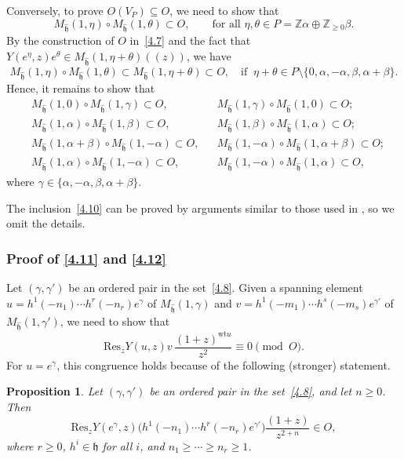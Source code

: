 \documentclass[12pt,a4paper,reqno]{amsart}
\numberwithin{equation}{section}
\numberwithin{equation}{section}
\newtheorem{prop}[thm]{Proposition}
\theoremstyle{definition}
\newcommand{\Z}{\mathbb{Z}}
\def \al{\alpha}
\def \ga {\gamma}
\def \b {\beta}
\def \op {\oplus}
\def \h {\mathfrak{h}}
\def\Res{\mathrm{Res}}
\def \wt {\mathrm{wt}}
\begin{document}
	Conversely, to prove $O(V_P)\subseteq O$, we need to show that 
	\begin{equation}\label{eq:goal}
		M_{\hat{\h}}(1,\eta)\circ M_{\hat{\h}}(1,\theta)\subset O, 
		\qquad \text{for all } \eta,\theta\in P=\Z\al\op\Z_{\geq 0}\b.
	\end{equation}
	By the construction of $O$ in~\eqref{4.7} and the fact that 
	$Y(e^{\eta},z)e^{\theta}\in M_{\hat{\h}}(1,\eta+\theta)((z))$, we have 
	\[
	M_{\hat{\h}}(1,\eta)\circ M_{\hat{\h}}(1,\theta)\subset M_{\hat{\h}}(1,\eta+\theta)\subset O,
	\quad \text{if }\ \eta+\theta\in P\setminus\{0,\al,-\al,\b,\al+\b\}.
	\]
	Hence, it remains to show that 
	\begin{align}
		&M_{\hat{\h}}(1,0)\circ M_{\hat{\h}}(1,\ga)\subset O,&&
		M_{\hat{\h}}(1,\ga)\circ M_{\hat{\h}}(1,0)\subset O; \label{4.10}\\
		&M_{\hat{\h}}(1,\al)\circ M_{\hat{\h}}(1,\b)\subset O,&&
		M_{\hat{\h}}(1,\b)\circ M_{\hat{\h}}(1,\al)\subset O; \label{4.11}\\
		&M_{\hat{\h}}(1,\al+\b)\circ M_{\hat{\h}}(1,-\al)\subset O,&&
		M_{\hat{\h}}(1,-\al)\circ M_{\hat{\h}}(1,\al+\b)\subset O; \label{4.12}\\
		&M_{\hat{\h}}(1,\al)\circ M_{\hat{\h}}(1,-\al)\subset O,&&
		M_{\hat{\h}}(1,-\al)\circ M_{\hat{\h}}(1,\al)\subset O, \label{4.13}
	\end{align}
	where $\ga\in\{\al,-\al,\b,\al+\b\}$.
	
	The inclusion~\eqref{4.10} can be proved by arguments similar to those used in 
	\cite[Proposition~6.5, Lemma~6.6, and Proposition~6.7]{Liu24}, so we omit the details. %
	
	
	\subsubsection{Proof of \eqref{4.11} and \eqref{4.12}} Let $(\ga,\ga')$ be an ordered pair in the set~\eqref{4.8}.  
	Given a spanning element $u=h^1(-n_1)\cdots h^r(-n_r)e^\ga$ of $M_{\hat{\h}}(1,\ga)$ and 
	$v=h^1(-m_1)\cdots h^s(-m_s)e^{\ga'}$ of $M_{\hat{\h}}(1,\ga')$,  
	we need to show that 
	\[
	\Res_z Y(u,z)v\,\frac{(1+z)^{\wt u}}{z^{2}}\equiv 0\pmod{O}.
	\]
	For $u=e^\ga$, this congruence holds because of the following (stronger) statement.
	
	\begin{prop}\label{prop4.5}
		Let $(\ga,\ga')$ be an ordered pair in the set~\eqref{4.8}, and let $n\geq 0$. Then 
		\begin{equation}\label{4.14}
			\Res_z Y(e^{\ga},z)\big(h^1(-n_1)\cdots h^r(-n_r)e^{\ga'}\big)\frac{(1+z)}{z^{2+n}}\in O,
		\end{equation}
		where $r\geq 0$, $h^i\in \h$ for all $i$, and $n_1\geq \cdots \geq n_r\geq 1$.
	\end{prop}
	
\end{document}
